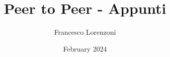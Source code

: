 

\title{Peer to Peer - Appunti}
\author{Francesco Lorenzoni}
\date{February 2024}



\maketitle
\tableofcontents







